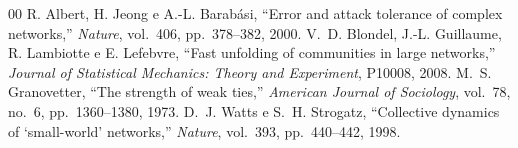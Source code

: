 \documentclass[conference]{IEEEtran}
\begin{document}
\begin{thebibliography}{00}
 R. Albert, H. Jeong e A.-L. Barabási, ``Error and attack tolerance of complex networks,'' \textit{Nature}, vol.~406, pp.~378--382, 2000.
 V.~D. Blondel, J.-L. Guillaume, R. Lambiotte e E. Lefebvre, ``Fast unfolding of communities in large networks,'' \textit{Journal of Statistical Mechanics: Theory and Experiment}, P10008, 2008.
 M.~S. Granovetter, ``The strength of weak ties,'' \textit{American Journal of Sociology}, vol.~78, no.~6, pp.~1360--1380, 1973.
 D.~J. Watts e S.~H. Strogatz, ``Collective dynamics of `small-world' networks,'' \textit{Nature}, vol.~393, pp.~440--442, 1998.
\end{thebibliography}
\end{document}
